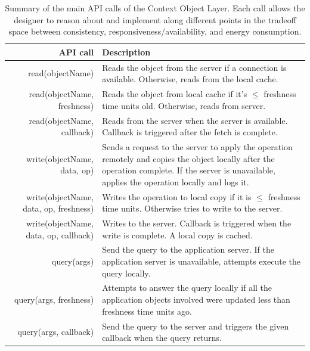 \begin{table}
\begin{center}
  \begin{tabular}{| r | p{9cm}  | }
    \hline
    {\bf API call } & {\bf Description }  \\ \hline
    read(objectName) & Reads the object from the server if a connection is available.  Otherwise, reads from the local cache. \\ \hline
    read(objectName, freshness) & Reads the object from local cache if it's $\leq$ freshness time units old.  Otherwise, reads from server. \\ \hline
    read(objectName, callback) & Reads from the server when the server is available.  Callback is triggered after the fetch is complete. \\ \hline
    write(objectName, data, op) & Sends a request to the server to apply the operation remotely and copies the object locally after the operation complete.  If the server is unavailable, applies the operation locally and logs it. \\ \hline
    write(objectName, data, op, freshness) & Writes the operation to local copy if it is $\leq$ freshness time units.  Otherwise tries to write to the server. \\ \hline
    write(objectName, data, op, callback) & Writes to the server.  Callback is triggered when the write is complete.  A local copy is cached. \\
    \hline
    query(args) & Send the query to the application server.  If the application server is unavailable, attempts execute the query locally. \\ \hline
    query(args, freshness) & Attempts to answer the query locally if all the application objects involved were updated less than freshness time units ago. \\ \hline
    query(args, callback) & Send the query to the server and triggers the given callback when the query returns. \\ \hline
  \end{tabular}
\caption{Summary of the main API calls of the Context Object Layer.  Each call allows the designer to reason about and implement
along different points in the tradeoff space between consistency, responsiveness/availability, and energy consumption.}
\label{tab:api}
\end{center}
\end{table}

